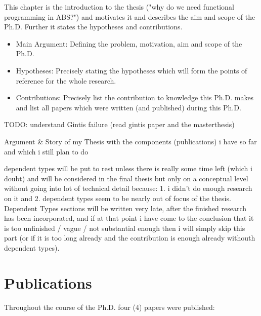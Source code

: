 This chapter is the introduction to the thesis ("why do we need functional programming in ABS?") and motivates it and describes the aim and scope of the Ph.D. Further it states the hypotheses and contributions. 
\begin{itemize}
	\item Main Argument: Defining the problem, motivation, aim and scope of the Ph.D.
	\item Hypotheses: Precisely stating the hypotheses which will form the points of reference for the whole research.
	\item Contributions: Precisely list the contribution to knowledge this Ph.D. makes and list all papers which were written (and published) during this Ph.D.
\end{itemize}

TODO: understand Gintis failure (read gintis paper and the masterthesis)

Argument \& Story of my Thesis with the components (publications) i have so far and which i still plan to do

dependent types will be put to rest unless there is really some time left (which i doubt) and will be considered in the final thesis but only on a conceptual level without going into lot of technical detail because: 1. i didn't do enough research on it and 2. dependent types seem to be nearly out of focus of the thesis. Dependent Types sections will be written very late, after the finished research has been incorporated, and if at that point i have come to the conclusion that it is too unfinished / vague / not substantial enough then i will simply skip this part (or if it is too long already and the contribution is enough already withouth dependent types).

\section{Publications}
Throughout the course of the Ph.D. four (4) papers were published:

